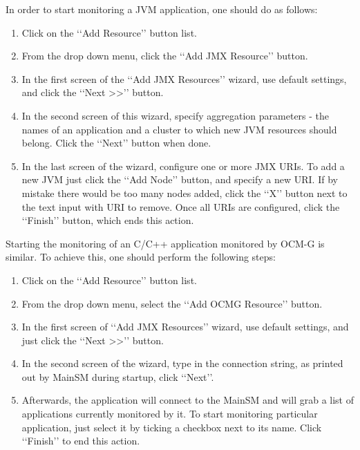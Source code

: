 In order to start monitoring a JVM application, one should do as follows:

\begin{enumerate}

\item Click on the \lq\lq{}Add Resource\rq\rq{} button list. 

\item From the drop down menu, click the \lq\lq{}Add JMX Resource\rq\rq{} button.

\item In the first screen of the \lq\lq{}Add JMX Resources\rq\rq{} wizard, use default settings, and click the \lq\lq{}Next >>\rq\rq{} button.

\item In the second screen of this wizard, specify aggregation parameters - the names of an application and a cluster to which new JVM resources should belong. Click the \lq\lq{}Next\rq\rq{} button when done.

\item In the last screen of the wizard, configure one or more JMX URIs. To add a new JVM just click the \lq\lq{}Add Node\rq\rq{} button, and specify a new URI. If by mistake there would be too many nodes added, click the \lq\lq{}X\rq\rq{} button next to the text input with URI to remove. Once all URIs are configured, click the \lq\lq{}Finish\rq\rq{} button, which ends this action.

\end{enumerate}

Starting the monitoring of an C/C++ application monitored by OCM-G is  similar. To achieve this, one should perform the following steps:

\begin{enumerate}

\item Click on the \lq\lq{}Add Resource\rq\rq{} button list.

\item From the drop down menu, select the \lq\lq{}Add OCMG Resource\rq\rq{} button.

\item In the first screen of \lq\lq{}Add JMX Resources\rq\rq{} wizard, use default settings, and just click the \lq\lq{}Next >>\rq\rq{} button.

\item In the second screen of the wizard, type in the connection string, as printed out by MainSM during startup, click \lq\lq{}Next\rq\rq{}.

\item Afterwards, the application will connect to the MainSM and will grab a list of applications currently monitored by it. To start monitoring particular application, just select it by ticking a checkbox next to its name. Click \lq\lq{}Finish\rq\rq{} to end this action.

\end{enumerate}

